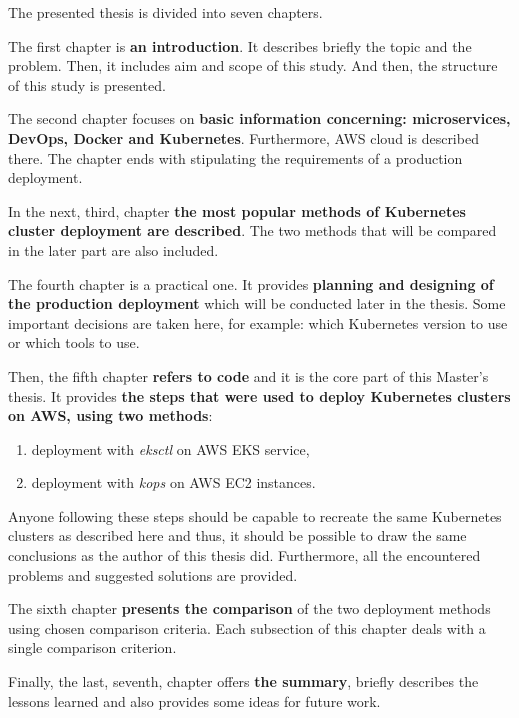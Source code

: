 The presented thesis is divided into seven chapters.

The first chapter is \textbf{an introduction}. It describes briefly the topic and the problem. Then, it includes aim and scope of this study. And then, the structure of this study is presented.

The second chapter focuses on \textbf{basic information concerning: microservices, DevOps, Docker and Kubernetes}. Furthermore, AWS cloud is described there. The chapter ends with stipulating the requirements of a production deployment.

In the next, third, chapter \textbf{the most popular methods of Kubernetes cluster deployment are described}. The two methods that will be compared in the later part are also included.

The fourth chapter is a practical one. It provides \textbf{planning and designing of the production deployment} which will be conducted later in the thesis. Some important decisions are taken here, for example: which Kubernetes version to use or which tools to use.

Then, the fifth chapter \textbf{refers to code} and it is the core part of this Master's thesis. It provides \textbf{the steps that were used to deploy Kubernetes clusters on AWS, using two methods}:
\begin{enumerate}
\item deployment with \textit{eksctl} on AWS EKS service,
\item deployment with \textit{kops} on AWS EC2 instances.
\end{enumerate}
Anyone following these steps should be capable to recreate the same Kubernetes clusters as described here and thus, it should be possible to draw the same conclusions as the author of this thesis did. Furthermore, all the encountered problems and suggested solutions are provided.

The sixth chapter \textbf{presents the comparison} of the two deployment methods using chosen comparison criteria. Each subsection of this chapter deals with a single comparison criterion.

Finally, the last, seventh, chapter offers \textbf{the summary}, briefly describes the lessons learned and also provides some ideas for future work.
